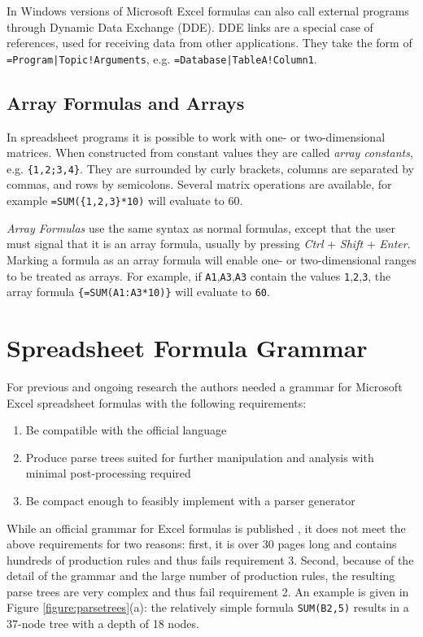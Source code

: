 \documentclass[conference]{IEEEtran}
\begin{document}
In Windows versions of Microsoft Excel formulas can also call external programs through Dynamic Data Exchange (DDE). DDE links are a special case of references, used for receiving data from other applications. They take the form of \texttt{=Program|Topic!Arguments}, e.g. \texttt{=Database|TableA!Column1}.

\subsection{Array Formulas and Arrays}
\label{sec:arrayformulas}
In spreadsheet programs it is possible to work with one- or two-dimensional matrices. When constructed from constant values they are called \emph{array constants}, e.g. \texttt{\{1,2;3,4\}}.
They are surrounded by curly brackets, columns are separated by commas, and rows by semicolons.
Several matrix operations are available, for example \texttt{=SUM(\{1,2,3\}*10)} will evaluate to 60.

\emph{Array Formulas} use the same syntax as normal formulas, except that the user must signal that it is an array formula, usually by pressing \emph{Ctrl} + \emph{Shift} + \emph{Enter}.
Marking a formula as an array formula will enable one- or two-dimensional ranges to be treated as arrays.
For example, if \texttt{A1},\texttt{A3},\texttt{A3} contain the values \texttt{1},\texttt{2},\texttt{3}, the array formula \texttt{\{=SUM(A1:A3*10)\}} will evaluate to \texttt{60}.

\section{Spreadsheet Formula Grammar}
\label{section:grammar}

For previous and ongoing research the authors needed a grammar for Microsoft Excel spreadsheet formulas with the following requirements:

\label{sec:designgoals}
\begin{enumerate}
\item Be compatible with the official language
\item Produce parse trees suited for further manipulation and analysis with minimal post-processing required
\item Be compact enough to feasibly implement with a parser generator
\end{enumerate}

While an official grammar for Excel formulas is published \cite{ExcelOfficialGrammar}, it does not meet the above requirements for two reasons: first, it is over 30 pages long and contains hundreds of production rules and thus fails requirement 3.
Second, because of the detail of the grammar and the large number of production rules, the resulting parse trees are very complex and thus fail requirement 2.
An example is given in Figure \ref{figure:parsetrees}(a): the relatively simple formula \texttt{SUM(B2,5)} results in a 37-node tree with a depth of 18 nodes.
\end{document}
